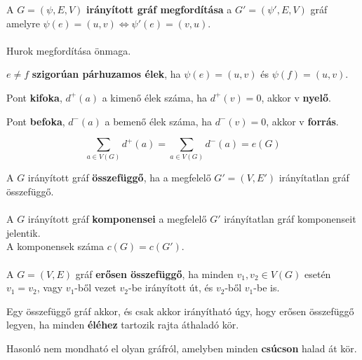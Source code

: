 \begin{frame}
\begin{tcolorbox}[squeezed title={Def.: Irányított gráf megfordítása}]
A $G = ({\psi}, E, V)$ \textbf{irányított gráf megfordítása} a $G' = ({\psi}', E, V)$ gráf amelyre ${\psi}(e) = (u, v) \iff {\psi}'(e) = (v, u)$.\\
\\
Hurok megfordítása önmaga.
\end{tcolorbox}

\begin{tcolorbox}[title={Def.: Sigorúan Párhuzamos Élek}]
$e \neq f$ \textbf{szigorúan párhuzamos élek}, ha ${\psi}(e) = (u, v)$ és ${\psi}(f) = (u, v)$.
\end{tcolorbox}

\begin{tcolorbox}[title={Def.: Kifok, Nyelő}]
Pont \textbf{kifoka}, $d^+(a)$ a kimenő élek száma, ha $d^+(v) = 0$, akkor v \textbf{nyelő}.
\end{tcolorbox}

\begin{tcolorbox}[title={Def.: Befok, Forrás}]
Pont \textbf{befoka}, $d^-(a)$ a bemenő élek száma, ha $d^-(v) = 0$, akkor v \textbf{forrás}.
\end{tcolorbox}

\begin{tcolorbox}[title={Ész}]
$$\sum_{a \in V(G)} d^+(a) = \sum_{a \in V(G)} d^-(a) = e(G)$$
\end{tcolorbox}
\end{frame}


\begin{frame}
\begin{tcolorbox}[ title={Def.: Összefüggőség (Irányított gráf)}]
A $G$ irányított gráf \textbf{összefüggő}, ha a megfelelő $G' = (V, E')$ irányítatlan gráf összefüggő.\\
\\
A $G$ irányított gráf \textbf{komponensei} a megfelelő $G'$ irányítatlan gráf komponenseit jelentik.\\
A komponensek száma $c(G) = c(G')$.\\
\\
A $G = (V, E)$ gráf \textbf{erősen összefüggő}, ha minden $v_1, v_2 \in V(G)$ esetén $v_1 = v_2$, vagy $v_1$-ből vezet $v_2$-be irányított út, és $v_2$-ből $v_1$-be is.
\end{tcolorbox}

\begin{tcolorbox}[title={Tétel: Erős összefüggőség}]
Egy összefüggő gráf akkor, és csak akkor irányítható úgy, hogy erősen összefüggő legyen, ha minden \textbf{éléhez} tartozik rajta áthaladó kör.
\end{tcolorbox}

\begin{tcolorbox}[title={Ész}]
Hasonló nem mondható el olyan gráfról, amelyben minden \textbf{csúcson} halad át kör.
\end{tcolorbox}
\end{frame}


